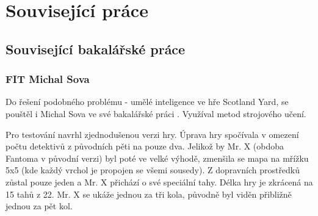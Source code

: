 


\chapter{Související práce}



\section{Související bakalářské práce}

\subsection{FIT Michal Sova}

Do řešení podobného problému - umělé inteligence ve hře Scotland Yard, se pouštěl i Michal Sova ve své bakalářské práci \cite{FITBT23706}. Využíval metod strojového učení.  

Pro testování navrhl zjednodušenou verzi hry. Úprava hry spočívala v omezení počtu detektivů z původních pěti na pouze dva. Jelikož by Mr. X (obdoba Fantoma v původní verzi) byl poté ve velké výhodě, zmenšila se mapa na mřížku 5x5 (kde každý vrchol je propojen se všemi sousedy). Z dopravních prostředků zůstal pouze jeden a Mr. X přichází o své speciální tahy. Délka hry je zkrácená na 15 tahů z 22. Mr. X se ukáže jednou za tři kola, původně byl viděn přibližně jednou za pět kol.  

